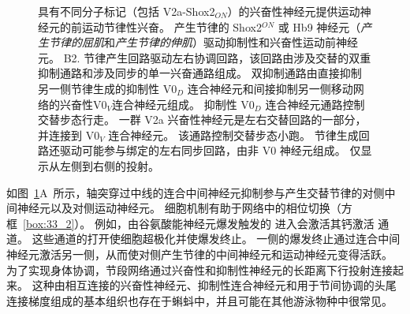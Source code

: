 \begin{figure}[htbp]
{	具有不同分子标记（包括 V2a-Shox2$_{ON}$）的兴奋性神经元提供运动神经元的前运动节律性兴奋。
	产生节律的 Shox2$ ^{ON} $ 或 Hb9 神经元（\textit{产生节律的屈肌}和\textit{产生节律的伸肌}）驱动抑制性和兴奋性运动前神经元\cite{kiehn2016decoding}。
	B2. 节律产生回路驱动左右协调回路，该回路由涉及交替的双重抑制通路和涉及同步的单一兴奋通路组成。
	双抑制通路由直接抑制另一侧节律生成的抑制性 V0$_D$ 连合神经元和间接抑制另一侧移动网络的兴奋性V0$_V$连合神经元组成。
	抑制性 V0$_D$ 连合神经元通路控制交替步态行走。
	一群 V2a 兴奋性神经元是左右交替回路的一部分，并连接到 V0$_V$ 连合神经元。
	该通路控制交替步态小跑。
	节律生成回路还驱动可能参与绑定的左右同步回路，由非 V0 神经元组成。
	仅显示从左侧到右侧的投射\cite{kiehn2016decoding}。}
	\label{fig:33_7}
\end{figure}


如图~\ref{fig:33_7}A~所示，轴突穿过中线的连合中间神经元抑制参与产生交替节律的对侧中间神经元以及对侧运动神经元。
细胞机制有助于网络中的相位切换（方框~\ref{box:33_2}）。
例如，由谷氨酸能神经元爆发触发的  进入会激活其钙激活  通道。
这些通道的打开使细胞超极化并使爆发终止。
一侧的爆发终止通过连合中间神经元激活另一侧，从而使对侧产生节律的中间神经元和运动神经元变得活跃。
为了实现身体协调，节段网络通过兴奋性和抑制性神经元的长距离下行投射连接起来。
这种由相互连接的兴奋性神经元、抑制性连合神经元和用于节间协调的头尾连接梯度组成的基本组织也存在于蝌蚪中，并且可能在其他游泳物种中很常见。


